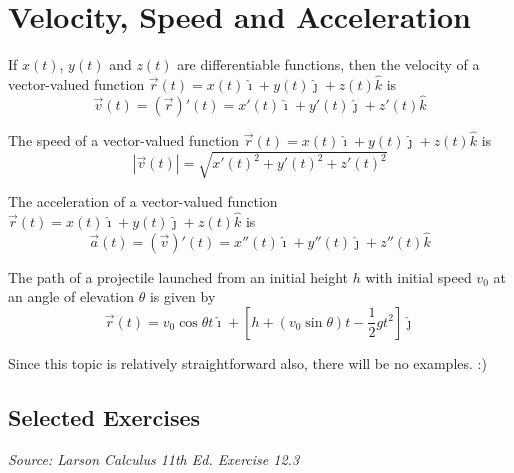 \chapter{Velocity, Speed and Acceleration}

If $x(t)$, $y(t)$ and $z(t)$ are differentiable functions, then the velocity of
a vector-valued function $\vec{r}(t) = x(t)\hat{\imath} + y(t)\hat{\jmath} +
    z(t)\hat{k}$ is \[\vec{v}(t) = (\vec{r})'(t) = x'(t)\hat{\imath} + y'(t)\hat{\jmath} + z'(t)\hat{k}\]

The speed of a vector-valued function $\vec{r}(t) = x(t)\hat{\imath} +
    y(t)\hat{\jmath} + z(t)\hat{k}$ is \[|\vec{v}(t)| = \sqrt{x'(t)^2 + y'(t)^2 + z'(t)^2}\]

The acceleration of a vector-valued function $\vec{r}(t) = x(t)\hat{\imath} +
    y(t)\hat{\jmath} + z(t)\hat{k}$ is \[\vec{a}(t) = (\vec{v})'(t) = x''(t)\hat{\imath} + y''(t)\hat{\jmath} + z''(t)\hat{k}\]

The path of a projectile launched from an initial height $h$ with initial speed
$v_0$ at an angle of elevation $\theta$ is given by \[\vec{r}(t) = v_0\cos\theta t\hat{\imath} + \left[h + (v_0\sin\theta) t - \frac{1}{2}gt^2\right]\hat{\jmath}\]

Since this topic is relatively straightforward also, there will be no examples.
:)

\newpage

\section*{Selected Exercises}
\textit{Source: Larson Calculus 11th Ed. Exercise 12.3}

